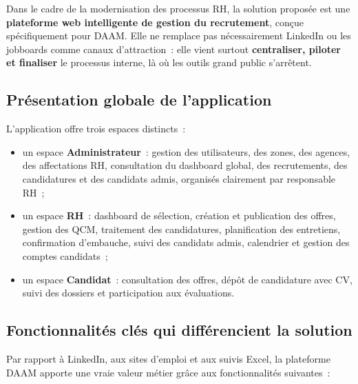 Dans le cadre de la modernisation des processus RH, la solution proposée est
une \textbf{plateforme web intelligente de gestion du recrutement}, conçue
spécifiquement pour DAAM. Elle ne remplace pas nécessairement LinkedIn ou les
jobboards comme canaux d'attraction~: elle vient surtout \textbf{centraliser,
piloter et finaliser} le processus interne, là où les outils grand public
s'arrêtent.


\subsection{Présentation globale de l'application}

L'application offre trois espaces distincts~:

\begin{itemize}
  \item un espace \textbf{Administrateur}~: gestion des utilisateurs, des
        zones, des agences, des affectations RH, consultation du dashboard
        global, des recrutements, des candidatures et des candidats admis,
        organisés clairement par responsable RH~;
  \item un espace \textbf{RH}~: dashboard de sélection, création et publication
        des offres, gestion des QCM, traitement des candidatures, planification
        des entretiens, confirmation d'embauche, suivi des candidats admis,
        calendrier et gestion des comptes candidats~;
  \item un espace \textbf{Candidat}~: consultation des offres, dépôt de
        candidature avec CV, suivi des dossiers et participation aux
        évaluations.
\end{itemize}


\subsection{Fonctionnalités clés qui différencient la solution}

Par rapport à LinkedIn, aux sites d'emploi et aux suivis Excel, la plateforme
DAAM apporte une vraie valeur métier grâce aux fonctionnalités suivantes~:


